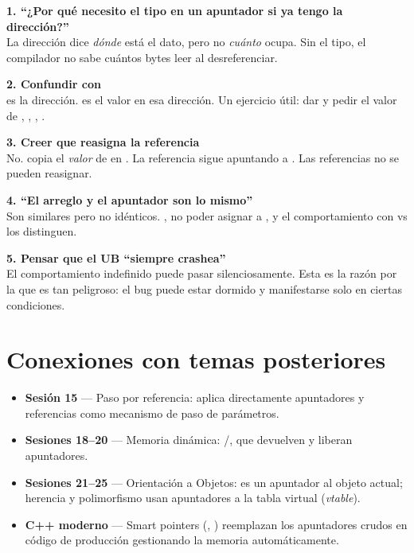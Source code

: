 \documentclass[12pt, oneside]{article}
\begin{document}
\begin{notaprofesor}

\textbf{1. ``¿Por qué necesito el tipo en un apuntador si ya tengo la dirección?''}\\
La dirección dice \textit{dónde} está el dato, pero no \textit{cuánto} ocupa.
Sin el tipo, el compilador no sabe cuántos bytes leer al desreferenciar.

\vspace{0.6em}
\textbf{2. Confundir  con }\\
 es la dirección.  es el valor en esa dirección. Un ejercicio
útil: dar  y pedir el valor de , ,
, .

\vspace{0.6em}
\textbf{3. Creer que  reasigna la referencia}\\
No.  copia el \textit{valor} de  en . La referencia
sigue apuntando a . Las referencias no se pueden reasignar.

\vspace{0.6em}
\textbf{4. ``El arreglo y el apuntador son lo mismo''}\\
Son similares pero no idénticos. , no poder asignar a ,
y el comportamiento con  vs  los distinguen.

\vspace{0.6em}
\textbf{5. Pensar que el UB ``siempre crashea''}\\
El comportamiento indefinido puede pasar silenciosamente. Esta es la razón
por la que es tan peligroso: el bug puede estar dormido y manifestarse solo
en ciertas condiciones.

\end{notaprofesor}

\section{Conexiones con temas posteriores}

\begin{itemize}
  \item \textbf{Sesión 15} — Paso por referencia: aplica directamente
        apuntadores y referencias como mecanismo de paso de parámetros.
  \item \textbf{Sesiones 18--20} — Memoria dinámica: /,
        que devuelven y liberan apuntadores.
  \item \textbf{Sesiones 21--25} — Orientación a Objetos:  es un
        apuntador al objeto actual; herencia y polimorfismo usan apuntadores
        a la tabla virtual (\textit{vtable}).
  \item \textbf{C++ moderno} — Smart pointers (,
        ) reemplazan los apuntadores crudos en código de
        producción gestionando la memoria automáticamente.
\end{itemize}
\end{document}
